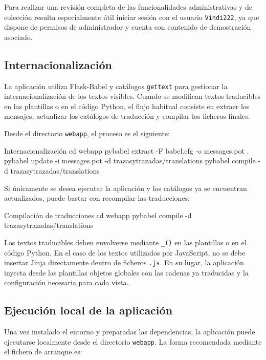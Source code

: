 Para realizar una revisión completa de las funcionalidades administrativas y de colección resulta especialmente útil iniciar sesión con el usuario \texttt{Vindi222}, ya que dispone de permisos de administrador y cuenta con contenido de demostración asociado.

\subsection{Internacionalización}

La aplicación utiliza Flask-Babel y catálogos \texttt{gettext} para gestionar la internacionalización de los textos visibles. Cuando se modifican textos traducibles en las plantillas o en el código Python, el flujo habitual consiste en extraer los mensajes, actualizar los catálogos de traducción y compilar los ficheros finales.

Desde el directorio \texttt{webapp}, el proceso es el siguiente:

\begin{pythonbox}{Internacionalización}
cd webapp
pybabel extract -F babel.cfg -o messages.pot .
pybabel update -i messages.pot -d trazasytrazadas/translations
pybabel compile -d trazasytrazadas/translations
\end{pythonbox}

Si únicamente se desea ejecutar la aplicación y los catálogos ya se encuentran actualizados, puede bastar con recompilar las traducciones:

\begin{pythonbox}{Compilación de traducciones}
cd webapp
pybabel compile -d trazasytrazadas/translations
\end{pythonbox}

Los textos traducibles deben envolverse mediante \texttt{\_()} en las plantillas o en el código Python. En el caso de los textos utilizados por JavaScript, no se debe insertar Jinja directamente dentro de ficheros \texttt{.js}. En su lugar, la aplicación inyecta desde las plantillas objetos globales con las cadenas ya traducidas y la configuración necesaria para cada vista.

\subsection{Ejecución local de la aplicación}

Una vez instalado el entorno y preparadas las dependencias, la aplicación puede ejecutarse localmente desde el directorio \texttt{webapp}. La forma recomendada mediante el fichero de arranque es:

